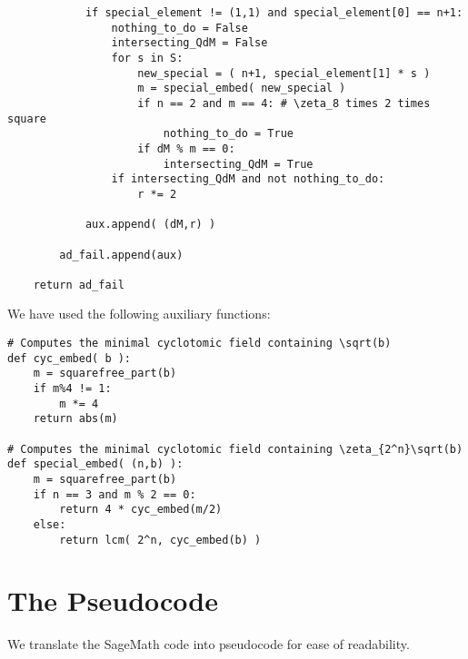 \documentclass[10pt,a4paper]{article}
\theoremstyle{definition}
\begin{document}
\begin{lstlisting}
            if special_element != (1,1) and special_element[0] == n+1:
                nothing_to_do = False
                intersecting_QdM = False
                for s in S:
                    new_special = ( n+1, special_element[1] * s )
                    m = special_embed( new_special )
                    if n == 2 and m == 4: # \zeta_8 times 2 times square
                        nothing_to_do = True
                    if dM % m == 0:
                        intersecting_QdM = True
                if intersecting_QdM and not nothing_to_do:
                    r *= 2

            aux.append( (dM,r) )
        
        ad_fail.append(aux)

    return ad_fail
\end{lstlisting}

We have used the following auxiliary functions:

\begin{lstlisting}
# Computes the minimal cyclotomic field containing \sqrt(b)
def cyc_embed( b ):
    m = squarefree_part(b)
    if m%4 != 1:
        m *= 4
    return abs(m)

# Computes the minimal cyclotomic field containing \zeta_{2^n}\sqrt(b)
def special_embed( (n,b) ):
    m = squarefree_part(b)
    if n == 3 and m % 2 == 0:
        return 4 * cyc_embed(m/2)
    else:
        return lcm( 2^n, cyc_embed(b) )
\end{lstlisting}

\section{The Pseudocode}
We translate the SageMath code into pseudocode for ease of readability.
\end{document}
